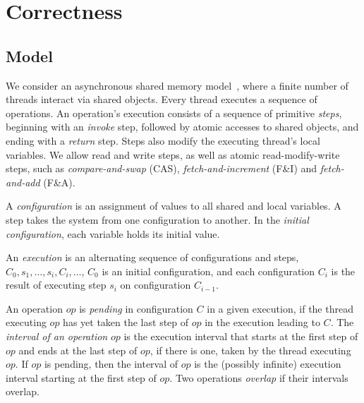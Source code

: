 

\section{Correctness}
\label{sec:proof}
\subsection{Model}
We consider an asynchronous shared memory model~\cite{Welch2004}, where a finite number of threads interact via shared objects. %
Every thread executes a sequence of operations.
An operation's execution consists of a sequence of primitive \emph{steps}, beginning with an \emph{invoke} step, followed by
atomic accesses to shared objects, and ending with a \emph{return} step. Steps also modify the executing thread's local variables.
We allow read and write steps,  as well as atomic
read-modify-write steps, such as \emph{compare-and-swap} (CAS), \emph{fetch-and-increment} (F\&I) and \emph{fetch-and-add} (F\&A). 

A \emph{configuration} is an assignment of values to all shared and local variables. A step takes the system from one
configuration to another. %
In the \emph{initial configuration}, each variable holds its initial value.

An \emph{execution} is an alternating sequence of configurations and steps,
$C_0,s_1,\ldots,s_i,C_i,\ldots$,
$C_0$ is an initial configuration,
and each configuration $C_i$ is the result of
executing step $s_i$ on configuration $C_{i-1}$.

An operation $op$ is \emph{pending} in 
configuration $C$ in a given execution, if the thread executing $op$ has yet taken the last step of $op$ in the
execution leading to $C$.
The \emph{interval of an operation} $op$ is the execution interval
that starts at the first step of $op$ and ends at the last step of
$op$, if there is one, taken by the thread executing $op$. If $op$ is pending, then
the interval of $op$ is the (possibly infinite) execution interval
starting at the first step of $op$. 
Two operations \emph{overlap} if their intervals overlap.

